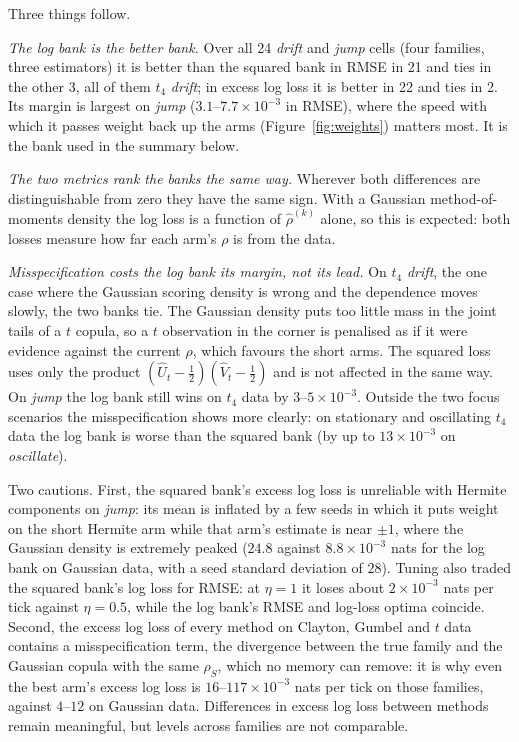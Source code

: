 Three things follow.

\emph{The log bank is the better bank.} Over all 24 \emph{drift} and \emph{jump} cells (four
families, three estimators) it is better than the squared bank in RMSE in 21 and ties in the other
3, all of them $t_4$ \emph{drift}; in excess log loss it is better in 22 and ties in 2. Its margin
is largest on \emph{jump} ($3.1$--$7.7\times10^{-3}$ in RMSE), where the speed with which it passes
weight back up the arms (Figure~\ref{fig:weights}) matters most. It is the bank used in the
summary below.

\emph{The two metrics rank the banks the same way.} Wherever both differences are distinguishable
from zero they have the same sign. With a Gaussian method-of-moments density the log loss is a
function of $\hat\rho^{(k)}$ alone, so this is expected: both losses measure how far each arm's
$\rho$ is from the data.

\emph{Misspecification costs the log bank its margin, not its lead.} On $t_4$ \emph{drift}, the one
case where the Gaussian scoring density is wrong and the dependence moves slowly, the two banks
tie. The Gaussian density puts too little mass in the joint tails of a $t$ copula, so a $t$
observation in the corner is penalised as if it were evidence against the current $\rho$, which
favours the short arms. The squared loss uses only the product
$(\hat U_t-\tfrac12)(\hat V_t-\tfrac12)$ and is not affected in the same way. On \emph{jump} the
log bank still wins on $t_4$ data by $3$--$5\times10^{-3}$. Outside the two focus scenarios the
misspecification shows more clearly: on stationary and oscillating $t_4$ data the log bank is
worse than the squared bank (by up to $13\times10^{-3}$ on \emph{oscillate}).

Two cautions. First, the squared bank's excess log loss is unreliable with Hermite components on
\emph{jump}: its mean is inflated by a few seeds in which it puts weight on the short Hermite arm
while that arm's estimate is near $\pm1$, where the Gaussian density is extremely peaked
($24.8$ against $8.8\times10^{-3}$ nats for the log bank on Gaussian data, with a seed standard
deviation of $28$). Tuning also traded the squared bank's log loss for RMSE: at $\eta=1$ it loses
about $2\times10^{-3}$ nats per tick against $\eta=0.5$, while the log bank's RMSE and log-loss
optima coincide. Second, the excess log loss of every method on Clayton, Gumbel and $t$ data
contains a misspecification term, the divergence between the true family and the Gaussian
copula with the same $\rho_S$, which no memory can remove: it is why even the best arm's excess
log loss is $16$--$117\times10^{-3}$ nats per tick on those families, against $4$--$12$ on
Gaussian data. Differences in excess log loss between methods remain meaningful, but levels across
families are not comparable.

